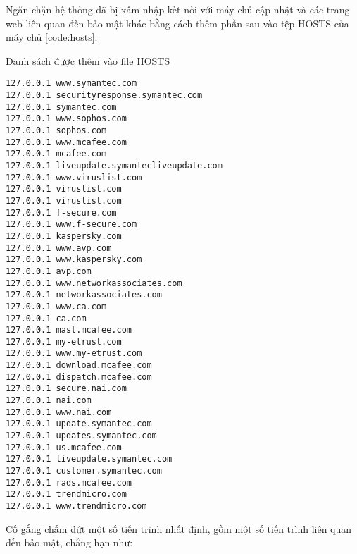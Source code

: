 Ngăn chặn hệ thống đã bị xâm nhập kết nối với máy chủ cập nhật và các trang web liên quan đến bảo mật khác bằng cách thêm phần sau vào tệp HOSTS của máy chủ \ref{code:hosts}:
\begin{listing}[ht]
	\caption{Danh sách được thêm vào file HOSTS}
	\label{code:hosts}
	\begin{verbatim}
127.0.0.1 www.symantec.com
127.0.0.1 securityresponse.symantec.com
127.0.0.1 symantec.com
127.0.0.1 www.sophos.com
127.0.0.1 sophos.com
127.0.0.1 www.mcafee.com
127.0.0.1 mcafee.com
127.0.0.1 liveupdate.symantecliveupdate.com
127.0.0.1 www.viruslist.com
127.0.0.1 viruslist.com
127.0.0.1 viruslist.com
127.0.0.1 f-secure.com
127.0.0.1 www.f-secure.com
127.0.0.1 kaspersky.com
127.0.0.1 www.avp.com
127.0.0.1 www.kaspersky.com
127.0.0.1 avp.com
127.0.0.1 www.networkassociates.com
127.0.0.1 networkassociates.com
127.0.0.1 www.ca.com
127.0.0.1 ca.com
127.0.0.1 mast.mcafee.com
127.0.0.1 my-etrust.com
127.0.0.1 www.my-etrust.com
127.0.0.1 download.mcafee.com
127.0.0.1 dispatch.mcafee.com
127.0.0.1 secure.nai.com
127.0.0.1 nai.com
127.0.0.1 www.nai.com
127.0.0.1 update.symantec.com
127.0.0.1 updates.symantec.com
127.0.0.1 us.mcafee.com
127.0.0.1 liveupdate.symantec.com
127.0.0.1 customer.symantec.com
127.0.0.1 rads.mcafee.com
127.0.0.1 trendmicro.com
127.0.0.1 www.trendmicro.com
\end{verbatim}
\end{listing}

Cố gắng chấm dứt một số tiến trình nhất định, gồm một số tiến trình liên quan đến bảo mật, chẳng hạn như:

